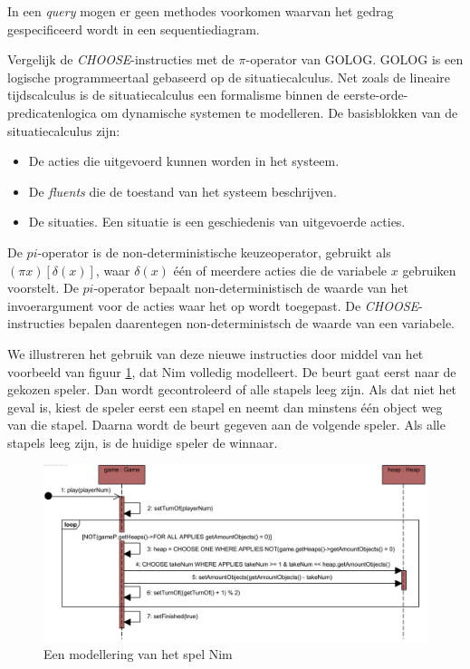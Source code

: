 In een \textit{query} mogen er geen methodes voorkomen waarvan het gedrag gespecificeerd wordt in een sequentiediagram.

Vergelijk de \textit{CHOOSE}-instructies met de $\pi$-operator van GOLOG\cite{levesque1997golog}. GOLOG is een logische programmeertaal gebaseerd op de situatiecalculus. Net zoals de lineaire tijdscalculus is de situatiecalculus een formalisme binnen de eerste-orde-predicatenlogica om dynamische systemen te modelleren. De basisblokken van de situatiecalculus zijn:

\begin{itemize}
	\item De acties die uitgevoerd kunnen worden in het systeem.
	\item De \textit{fluents} die de toestand van het systeem beschrijven.
	\item De situaties. Een situatie is een geschiedenis van uitgevoerde acties.
	
\end{itemize}

De $pi$-operator is de non-deterministische keuzeoperator, gebruikt als $(\pi{}x)[\delta{}(x)]$, waar $\delta{}(x)$ \'e\'en of meerdere acties die de variabele $x$ gebruiken voorstelt. De $pi$-operator bepaalt non-deterministisch de waarde van het invoerargument voor de acties waar het op wordt toegepast. De \textit{CHOOSE}-instructies bepalen daarentegen non-deterministsch de waarde van een variabele.

We illustreren het gebruik van deze nieuwe instructies door middel van het voorbeeld van figuur \ref{fig:new-nim}, dat Nim volledig modelleert. De beurt gaat eerst naar de gekozen speler. Dan wordt gecontroleerd of alle stapels leeg zijn. Als dat niet het geval is, kiest de speler eerst een stapel en neemt dan minstens \'e\'en object weg van die stapel. Daarna wordt de beurt gegeven aan de volgende speler. Als alle stapels leeg zijn, is de huidige speler de winnaar.

\begin{figure}[H]
	\includegraphics[width=\textwidth]{chap-gedrag/seq-new-nim.png}
	\caption{Een modellering van het spel Nim}
	\label{fig:new-nim}
\end{figure}

